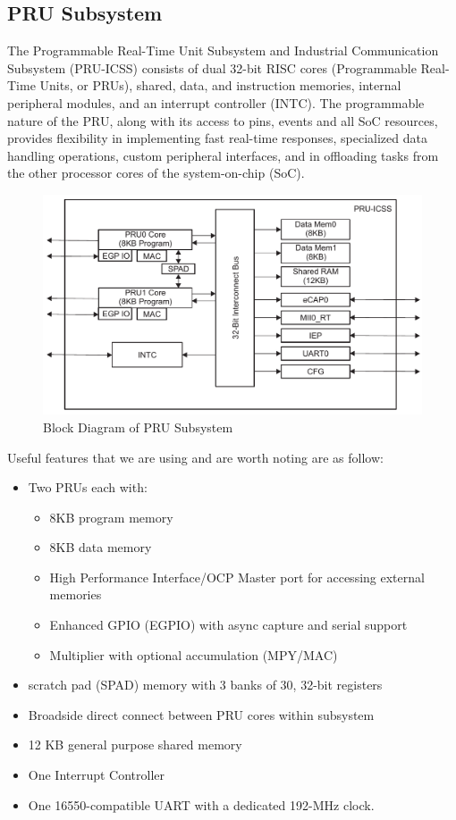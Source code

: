\subsection{PRU Subsystem}
The Programmable Real-Time Unit Subsystem and Industrial Communication Subsystem (PRU-ICSS) consists of dual 32-bit RISC cores (Programmable Real-Time Units, or PRUs), shared, data, and instruction memories, internal peripheral modules, and an interrupt controller (INTC). The programmable nature of the PRU, along with its access to pins, events and all SoC resources, provides flexibility in implementing fast real-time responses, specialized data handling operations, custom peripheral interfaces, and in offloading tasks from the other processor cores of the system-on-chip (SoC).

\begin{figure}
	\includegraphics[width=\textwidth]{fig/PRUIcss.png}
	\caption{Block Diagram of PRU Subsystem}
	\label{fig:prublkdrg}
\end{figure}

Useful features that we are using and are worth noting are as follow:
\begin{itemize}
	\item Two PRUs each with:
	\begin{itemize}
		\item 8KB program memory
		\item 8KB data memory
		\item High Performance Interface/OCP Master port for accessing external memories
		\item Enhanced GPIO (EGPIO) with async capture and serial support
		\item Multiplier with optional accumulation (MPY/MAC)		
	\end{itemize}
	\item scratch pad (SPAD) memory with 3 banks of 30, 32-bit registers 
	\item Broadside direct connect between PRU cores within subsystem
	\item 12 KB general purpose shared memory
	\item One Interrupt Controller
	\item One 16550-compatible UART with a dedicated 192-MHz clock.
\end{itemize} 


